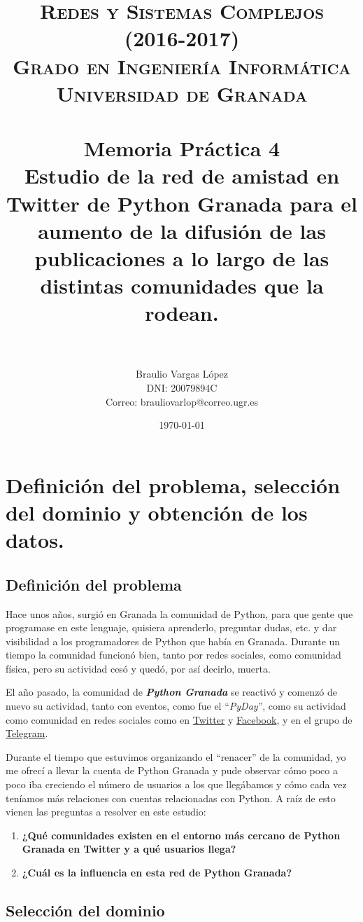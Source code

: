\documentclass[paper=a4, fontsize=11pt]{article} %
\title{
\normalfont \normalsize
\textsc{{\bf Redes y Sistemas Complejos (2016-2017)} \\ Grado en Ingeniería Informática \\ Universidad de Granada} \\ [25pt] %
\horrule{0.5pt} \\[0.4cm] %
\huge Memoria Práctica 4\\ Estudio de la red de amistad en Twitter de Python Granada para el aumento de la difusión de las publicaciones a lo largo de las distintas comunidades que la rodean.\\%
\horrule{2pt} \\[0.5cm] %
}
\author{Braulio Vargas López\\DNI: 20079894C\\Correo: brauliovarlop@correo.ugr.es} %
\date{\normalsize\today} %
\numberwithin{equation}{section} %
\numberwithin{figure}{section} %
\numberwithin{table}{section} %
\begin{document}
\maketitle %
\newpage %

\tableofcontents %
\newpage
{}

\section{Definición del problema, selección del dominio y obtención de los datos.}

\subsection{Definición del problema}

Hace unos años, surgió en Granada la comunidad de Python, para que gente que programase en este lenguaje, quisiera aprenderlo, preguntar dudas, etc. y dar visibilidad a los programadores de Python que había en Granada. Durante un tiempo la comunidad funcionó bien, tanto por redes sociales, como comunidad física, pero su actividad cesó y quedó, por así decirlo, muerta.

El año pasado, la comunidad de \textit{\textbf{Python Granada}} se reactivó y comenzó de nuevo su actividad, tanto con eventos, como fue el ``\textit{PyDay}'', como su actividad como comunidad en redes sociales como en \href{https://twitter.com/python_granada}{Twitter} y \href{https://www.facebook.com/Pythongranada/?fref=ts}{Facebook}, y en el grupo de \href{https://t.me/pythongranada}{Telegram}.

Durante el tiempo que estuvimos organizando el ``renacer'' de la comunidad, yo me ofrecí a llevar la cuenta de Python Granada y pude observar cómo poco a poco iba creciendo el número de usuarios a los que llegábamos y cómo cada vez teníamos más relaciones con cuentas relacionadas con Python. A raíz de esto vienen las preguntas a resolver en este estudio:
\begin{enumerate}[$\bullet$]
    \item \textbf{¿Qué comunidades existen en el entorno más cercano de Python Granada en Twitter y a qué usuarios llega?}
    \item \textbf{¿Cuál es la influencia en esta red de Python Granada?}
\end{enumerate}

\subsection{Selección del dominio}
\end{document}

